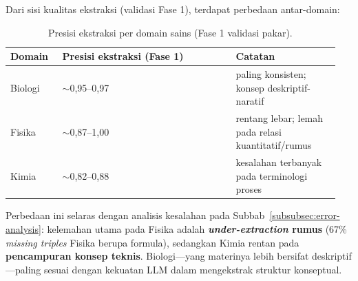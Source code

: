 \documentclass[main]{subfiles}
\begin{document}
Dari sisi kualitas ekstraksi (validasi Fase 1), terdapat perbedaan
antar-domain:

\begin{longtable}{@{}
  >{\raggedright\arraybackslash}p{0.15\linewidth}
  >{\raggedright\arraybackslash}p{0.50\linewidth}
  >{\raggedright\arraybackslash}p{0.30\linewidth}@{}}
\caption{Presisi ekstraksi per domain sains (Fase 1 validasi pakar).}
\label{tab:komparatif-domain}\\
\toprule
\textbf{Domain} & \textbf{Presisi ekstraksi (Fase 1)} & \textbf{Catatan} \\
\midrule
\endhead
Biologi & $\sim$0{,}95--0{,}97 & paling konsisten; konsep deskriptif-naratif \\
Fisika  & $\sim$0{,}87--1{,}00 & rentang lebar; lemah pada relasi kuantitatif/rumus \\
Kimia   & $\sim$0{,}82--0{,}88 & kesalahan terbanyak pada terminologi proses \\
\bottomrule
\end{longtable}

Perbedaan ini selaras dengan analisis kesalahan pada Subbab~\ref{subsubsec:error-analysis}:
kelemahan utama pada Fisika adalah \textbf{\textit{under-extraction} rumus} (67\%
\textit{missing triples} Fisika berupa formula), sedangkan Kimia rentan pada
\textbf{pencampuran konsep teknis}. Biologi---yang materinya lebih
bersifat deskriptif---paling sesuai dengan kekuatan LLM dalam mengekstrak
struktur konseptual.

\ifSubfilesClassLoaded{\printbibliography[title={Daftar Pustaka}]}{}
\end{document}
